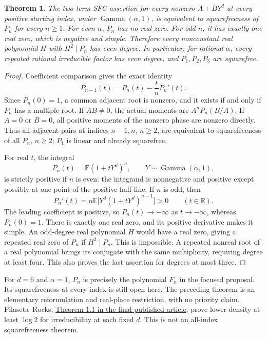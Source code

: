\documentclass[11pt]{article}
\newtheorem{theorem}{Theorem}
\newcommand{\E}{\mathbb E}
\begin{document}
\begin{theorem}\label{thm:realparity}
The two-term SFC assertion for every nonzero $A+BY^d$ at every positive
starting index, under $\operatorname{Gamma}(\alpha,1)$, is equivalent
to squarefreeness of $P_n$ for every $n\geq1$.
For even $n$, $P_n$ has no real zero. For odd $n$, it has exactly one
real zero, which is negative and simple. Therefore every nonconstant
real polynomial $H$ with $H^2\mid P_n$ has even degree. In particular,
for rational $\alpha$, every repeated rational irreducible factor has
even degree, and $P_1,P_2,P_3$ are squarefree.
\end{theorem}
\begin{proof}
Coefficient comparison gives the exact identity
\[
 P_{n-1}(t)=P_n(t)-\frac{t}{n}P_n'(t).
\]
Since $P_n(0)=1$, a common adjacent root is nonzero, and it exists
if and only if $P_n$ has a multiple root. If $AB\ne0$, the actual
moments are $A^nP_n(B/A)$. If $A=0$ or $B=0$, all positive moments
of the nonzero phase are nonzero directly. Thus all adjacent pairs
at indices $n-1,n$, $n\geq2$, are equivalent to squarefreeness of
all $P_n$, $n\geq2$; $P_1$ is linear and already squarefree.

For real $t$, the integral
\[
 P_n(t)=\E(1+tY^d)^n,\qquad Y\sim\operatorname{Gamma}(\alpha,1),
\]
is strictly positive if $n$ is even: the integrand is nonnegative
and positive except possibly at one point of the positive half-line.
If $n$ is odd, then
\[
 P_n'(t)=n\E\big[Y^d(1+tY^d)^{n-1}\big]>0
 \qquad(t\in\mathbb R).
\]
The leading coefficient is positive, so $P_n(t)\to-\infty$ as
$t\to-\infty$, whereas $P_n(0)=1$. There is exactly one real zero,
and its positive derivative makes it simple. An odd-degree real
polynomial $H$ would have a real zero, giving a repeated real zero
of $P_n$ if $H^2\mid P_n$. This is impossible. A repeated nonreal
root of a real polynomial brings its conjugate with the same
multiplicity, requiring degree at least four. This also proves the
last assertion for degrees at most three.
\end{proof}
For $d=6$ and $\alpha=1$, $P_n$ is precisely the polynomial $F_n$
in the focused proposal. Its squarefreeness at every index is still
open here. The preceding theorem is an elementary reformulation and
real-place restriction, with no priority claim. Filaseta--Rocks,
\href{https://www.impan.pl/shop/publication/transaction/download/product/91656}
{Theorem 1.1 in the final published article}, prove lower density at
least $\log2$ for irreducibility at each fixed $d$. This is not an
all-index squarefreeness theorem.
\end{document}
